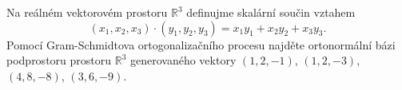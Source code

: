 Na reálném vektorovém prostoru $\mathbb{R}^3$ definujme skalární součin vztahem
$$(x_1, x_2, x_3) \cdot (y_1, y_2, y_3) = x_1 y_1 + x_2 y_2 + x_3 y_3.$$ 
Pomocí Gram-Schmidtova ortogonalizačního procesu najděte ortonormální bázi
podprostoru prostoru $\mathbb{R}^3$ generovaného vektory $(1,2,-1)$, $(1,2,-3)$,
$(4,8,-8)$, $(3,6,-9)$.
